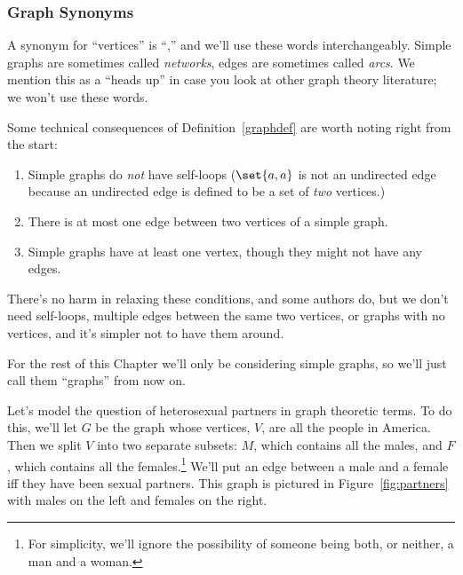 \subsubsection{Graph Synonyms}
A synonym for ``vertices'' is ``,'' and we'll use these
words interchangeably.  Simple graphs are sometimes
called \emph{networks}, edges are sometimes called \emph{arcs}.  We
mention this as a ``heads up'' in case you look at other graph theory
literature; we won't use these words.

Some technical consequences of Definition~\ref{graphdef} are worth noting
right from the start:
\begin{enumerate}
\item Simple graphs do \emph{not} have self-loops ($\set{a,a}$ is not an undirected edge because an undirected edge is defined to be a set of \emph{two} vertices.)

\item There is at most one edge between two vertices of a simple graph.

\item Simple graphs have at least one vertex, though they might not have
any edges.
\end{enumerate}
There's no harm in relaxing these conditions, and some authors do, but we don't need
self-loops, multiple edges between the same two vertices, or graphs with no vertices,
and it's simpler not to have them around.

For the rest of this Chapter we'll only be considering simple graphs, so we'll just
call them ``graphs'' from now on.


Let's model the question of heterosexual partners in graph theoretic terms.  To do
this, we'll let $G$ be the graph whose vertices, $V$, are all the people in America.
Then we split $V$ into two separate subsets: $M$, which contains all the males, and
$F$, which contains all the females.\footnote{For simplicity, we'll ignore the
possibility of someone being both, or neither, a man and a woman.}  We'll put an edge
between a male and a female iff they have been sexual partners.  This graph is pictured
in Figure~\ref{fig:partners} with males on the left and females on the right.

